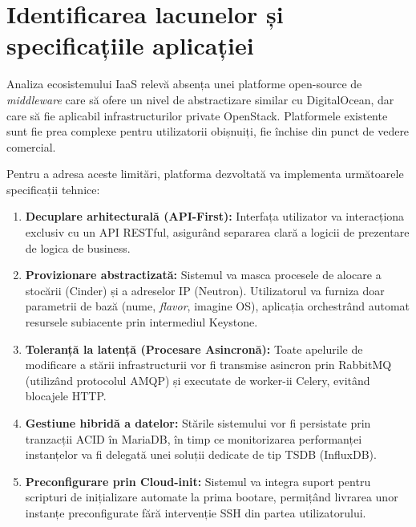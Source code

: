 \section{Identificarea lacunelor și specificațiile aplicației}

Analiza ecosistemului IaaS relevă absența unei platforme open-source de \textit{middleware} care să ofere un nivel de abstractizare similar cu DigitalOcean, dar care să fie aplicabil infrastructurilor private OpenStack. Platformele existente sunt fie prea complexe pentru utilizatorii obișnuiți, fie închise din punct de vedere comercial.

Pentru a adresa aceste limitări, platforma dezvoltată va implementa următoarele specificații tehnice:
\begin{enumerate}
    \item \textbf{Decuplare arhitecturală (API-First):} Interfața utilizator va interacționa exclusiv cu un API RESTful, asigurând separarea clară a logicii de prezentare de logica de business.
    \item \textbf{Provizionare abstractizată:} Sistemul va masca procesele de alocare a stocării (Cinder) și a adreselor IP (Neutron). Utilizatorul va furniza doar parametrii de bază (nume, \textit{flavor}, imagine OS), aplicația orchestrând automat resursele subiacente prin intermediul Keystone.
    \item \textbf{Toleranță la latență (Procesare Asincronă):} Toate apelurile de modificare a stării infrastructurii vor fi transmise asincron prin RabbitMQ (utilizând protocolul AMQP) și executate de worker-ii Celery, evitând blocajele HTTP.
    \item \textbf{Gestiune hibridă a datelor:} Stările sistemului vor fi persistate prin tranzacții ACID în MariaDB, în timp ce monitorizarea performanței instanțelor va fi delegată unei soluții dedicate de tip TSDB (InfluxDB).
    \item \textbf{Preconfigurare prin Cloud-init:} Sistemul va integra suport pentru scripturi de inițializare automate la prima bootare, permițând livrarea unor instanțe preconfigurate fără intervenție SSH din partea utilizatorului.
\end{enumerate}